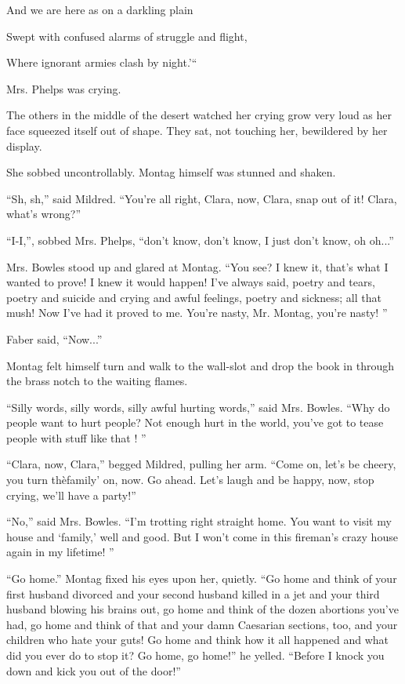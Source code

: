 \documentclass[11pt,openany]{book}
\begin{document}
And we are here as on a darkling plain

Swept with confused alarms of struggle and flight,

Where ignorant armies clash by night.'``

Mrs. Phelps was crying.

The others in the middle of the desert watched her crying grow very loud as her face squeezed itself out of shape. They sat, not touching her, bewildered by her display.

She sobbed uncontrollably. Montag himself was stunned and shaken.

``Sh, sh,'' said Mildred. ``You're all right, Clara, now, Clara, snap out of it! Clara, what's wrong?''

``I-I,'', sobbed Mrs. Phelps, ``don't know, don't know, I just don't know, oh oh...''

Mrs. Bowles stood up and glared at Montag. ``You see? I knew it, that's what I wanted to prove! I knew it would happen! I've always said, poetry and tears, poetry and suicide and crying and awful feelings, poetry and sickness; all that mush! Now I've had it proved to me. You're nasty, Mr. Montag, you're nasty! ''

Faber said, ``Now...''

Montag felt himself turn and walk to the wall-slot and drop the book in through the brass notch to the waiting flames.

``Silly words, silly words, silly awful hurting words,'' said Mrs. Bowles. ``Why do people want to hurt people? Not enough hurt in the world, you've got to tease people with stuff like that ! ''

``Clara, now, Clara,'' begged Mildred, pulling her arm. ``Come on, let's be cheery, you turn thèfamily' on, now. Go ahead. Let's laugh and be happy, now, stop crying, we'll have a party!''

``No,'' said Mrs. Bowles. ``I'm trotting right straight home. You want to visit my house and `family,' well and good. But I won't come in this fireman's crazy house again in my lifetime! ''

``Go home.'' Montag fixed his eyes upon her, quietly. ``Go home and think of your first husband divorced and your second husband killed in a jet and your third husband blowing his brains out, go home and think of the dozen abortions you've had, go home and think of that and your damn Caesarian sections, too, and your children who hate your guts! Go home and think how it all happened and what did you ever do to stop it? Go home, go home!'' he yelled. ``Before I knock you down and kick you out of the door!''
\end{document}
